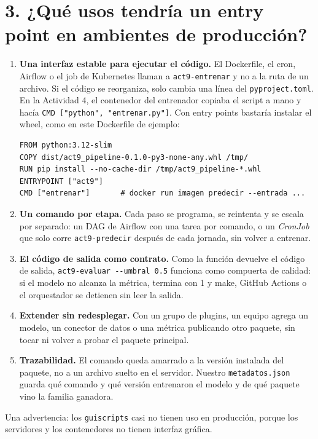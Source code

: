 \documentclass[12pt,a4paper]{article}
\renewcommand{\_}{\guionbajo\allowbreak}
\begin{document}
\section{3. ¿Qué usos tendría un entry point en ambientes de producción?}

\begin{enumerate}[leftmargin=1.4em]
\item \textbf{Una interfaz estable para ejecutar el código.} El Dockerfile, el cron, Airflow o el
job de Kubernetes llaman a \texttt{act9-entrenar} y no a la ruta de un archivo. Si el código se
reorganiza, solo cambia una línea del \texttt{pyproject.toml}. En la Actividad 4, el contenedor del
entrenador copiaba el script a mano y hacía \texttt{CMD ["python", "entrenar.py"]}. Con entry
points bastaría instalar el wheel, como en este Dockerfile de ejemplo:
\begin{verbatim}
FROM python:3.12-slim
COPY dist/act9_pipeline-0.1.0-py3-none-any.whl /tmp/
RUN pip install --no-cache-dir /tmp/act9_pipeline-*.whl
ENTRYPOINT ["act9"]
CMD ["entrenar"]       # docker run imagen predecir --entrada ...
\end{verbatim}
\item \textbf{Un comando por etapa.} Cada paso se programa, se reintenta y se escala por separado:
un DAG de Airflow con una tarea por comando, o un \emph{CronJob} que solo corre
\texttt{act9-predecir} después de cada jornada, sin volver a entrenar.
\item \textbf{El código de salida como contrato.} Como la función devuelve el código de salida,
\texttt{act9-evaluar -{}-umbral 0.5} funciona como compuerta de calidad: si el modelo no alcanza
la métrica, termina con 1 y make, GitHub Actions o el orquestador se detienen sin leer la salida.
\item \textbf{Extender sin redesplegar.} Con un grupo de plugins, un equipo agrega un modelo, un
conector de datos o una métrica publicando otro paquete, sin tocar ni volver a probar el paquete
principal.
\item \textbf{Trazabilidad.} El comando queda amarrado a la versión instalada del paquete, no a
un archivo suelto en el servidor. Nuestro \texttt{metadatos.json} guarda qué comando y qué versión
entrenaron el modelo y de qué paquete vino la familia ganadora.
\end{enumerate}

Una advertencia: los \texttt{gui\_scripts} casi no tienen uso en producción, porque los servidores y
los contenedores no tienen interfaz gráfica.
\end{document}
